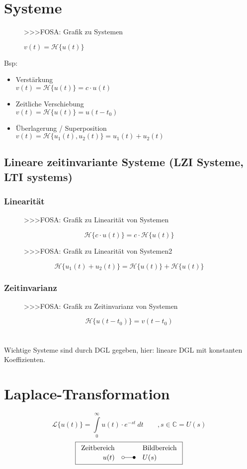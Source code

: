 \section{Systeme}
\begin{figure}[h!]
    \centering
    >>>FOSA: Grafik zu Systemen
    \caption{$v(t) = \mathcal{H}\lbrace u(t) \rbrace$}
    \label{fig:system}
\end{figure}
Bsp: 
\begin{itemize}
  \item Verstärkung \\
        $v(t) = \mathcal{H} \lbrace u(t) \rbrace = c \cdot u(t)$
  \item Zeitliche Verschiebung \\
        $v(t) = \mathcal{H} \lbrace u(t) \rbrace = u(t - t_0)$
  \item Überlagerung / Superposition \\
        $v(t) = \mathcal{H} \lbrace u_1(t), u_2(t) \rbrace = u_1(t) + u_2(t)$
\end{itemize}

\subsection{Lineare zeitinvariante Systeme (LZI Systeme, LTI systems)}
\subsubsection{Linearität}
\begin{figure}[h!]
    \centering
    >>>FOSA: Grafik zu Linearität von Systemen
    \caption{}
    \label{fig:linsystem}
\end{figure}
\[ \boxed{\mathcal{H} \lbrace c \cdot u(t) \rbrace 
= c \cdot \mathcal{H} \lbrace u(t) \rbrace} \]
\begin{figure}[h!]
    \centering
    >>>FOSA: Grafik zu Linearität von Systemen2
    \label{fig:linsystem2}
\end{figure}
\[ \boxed{\mathcal{H} \lbrace u_1(t) + u_2(t) \rbrace 
= \mathcal{H} \lbrace u(t) \rbrace + \mathcal{H} \lbrace u(t) \rbrace} \]

\subsubsection{Zeitinvarianz}
\begin{figure}[h!]
    \centering
    >>>FOSA: Grafik zu Zeitinvarianz von Systemen
    \caption{}
    \label{fig:timesystem}
\end{figure}
\[ \boxed{\mathcal{H} \lbrace u(t-t_0) \rbrace 
= v(t - t_0)} \]
\\\\
Wichtige Systeme sind durch DGL gegeben, hier: lineare DGL mit konstanten 
Koeffizienten. 

\section{Laplace-Transformation}
\[ \boxed{\mathcal{L} \lbrace u(t) \rbrace 
= \int\limits_{0}^{\infty} u(t) \cdot e^{-st} ~ dt \qquad , s \in \mathbb{C} 
= U(s)} \]
\[ \boxed{\begin{array}{rcl}
\text{Zeitbereich} &  & \text{Bildbereich} \\
u(t) & \laplace & U(s)
\end{array}} \]